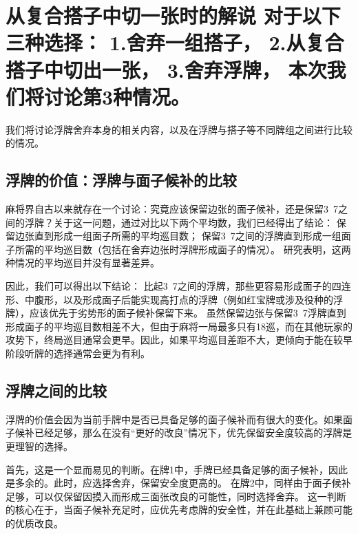\chapter[【一向听的技术】两面形的选择 其二]{从复合搭子中切一张时的解说 对于以下三种选择：
1.舍弃一组搭子，
2.从复合搭子中切出一张，
3.舍弃浮牌，
本次我们将讨论第3种情况。}
我们将讨论浮牌舍弃本身的相关内容，以及在浮牌与搭子等不同牌组之间进行比较的情况。

\section{浮牌的价值：浮牌与面子候补的比较}
麻将界自古以来就存在一个讨论：究竟应该保留边张的面子候补，还是保留3~7之间的浮牌？关于这一问题，通过对比以下两个平均数，我们已经得出了结论：
保留边张直到形成一组面子所需的平均巡目数；
保留3~7之间的浮牌直到形成一组面子所需的平均巡目数（包括在舍弃边张时浮牌形成面子的情况）。
研究表明，这两种情况的平均巡目并没有显著差异。

因此，我们可以得出以下结论：
比起3~7之间的浮牌，那些更容易形成面子的四连形、中腹形，以及形成面子后能实现高打点的浮牌（例如红宝牌或涉及役种的浮牌），应该优先于劣势形的面子候补保留下来。
虽然保留边张与保留3~7浮牌直到形成面子的平均巡目数相差不大，但由于麻将一局最多只有18巡，而在其他玩家的攻势下，终局巡目通常会更早。因此，如果平均巡目差距不大，更倾向于能在较早阶段听牌的选择通常会更为有利。

\section{浮牌之间的比较}
浮牌的价值会因为当前手牌中是否已具备足够的面子候补而有很大的变化。如果面子候补已经足够，那么在没有“更好的改良”情况下，优先保留安全度较高的浮牌是更理智的选择。

首先，这是一个显而易见的判断。在牌1中，手牌已经具备足够的面子候补，因此是多余的。此时，应选择舍弃，保留安全度更高的。
在牌2中，同样由于面子候补足够，可以仅保留因摸入而形成三面张改良的可能性，同时选择舍弃。
这一判断的核心在于，当面子候补充足时，应优先考虑牌的安全性，并在此基础上兼顾可能的优质改良。

